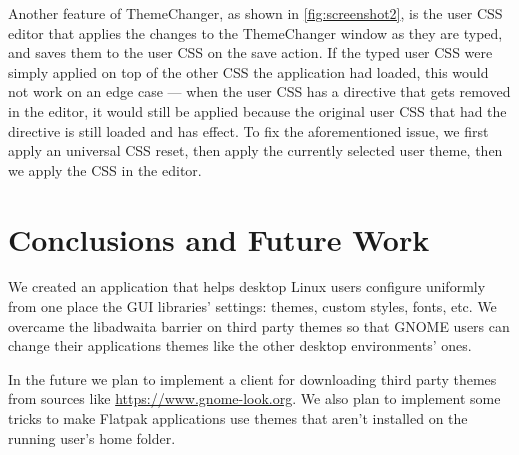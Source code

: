 \documentclass{article}
\begin{document}
Another feature of ThemeChanger, as shown in \cref{fig:screenshot2}, is the user CSS editor that applies the changes to the ThemeChanger window as they are typed, and saves them to the user CSS on the save action.
If the typed user CSS were simply applied on top of the other CSS the application had loaded, this would not work on an edge case --- when the user CSS has a directive that gets removed in the editor, it would still be applied because the original user CSS that had the directive is still loaded and has effect.
To fix the aforementioned issue, we first apply an universal CSS reset, then apply the currently selected user theme, then we apply the CSS in the editor.

\section{Conclusions and Future Work}
We created an application that helps desktop Linux users configure uniformly from one place the GUI libraries' settings: themes, custom styles, fonts, etc.
We overcame the libadwaita barrier on third party themes so that GNOME users can change their applications themes like the other desktop environments' ones.

In the future we plan to implement a client for downloading third party themes from sources like \url{https://www.gnome-look.org}.
We also plan to implement some tricks to make Flatpak applications use themes that aren't installed on the running user's home folder.

\printbibliography
\end{document}

